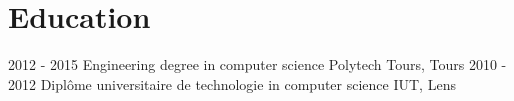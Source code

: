 \documentclass[]{friggeri-cv}
\begin{document}
\vspace{5pt}

\section{Education}
\vspace{-5pt}
\begin{entrylist}
  \vspace{-8pt}
  \entry
    {2012 - 2015}
    {Engineering degree in computer science}
    {Polytech Tours, Tours}
    {}
  \entry
    {2010 - 2012}
    {Diplôme universitaire de technologie in computer science}
    {IUT, Lens}
    {}
\end{entrylist}
\end{document}
